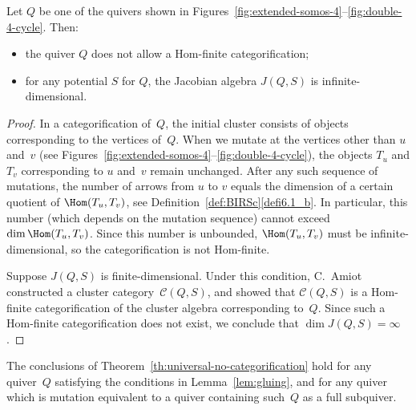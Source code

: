 

\begin{theorem}
\label{th:universal-no-categorification}
Let $Q$ be one of the quivers shown in Figures~\ref{fig:extended-somos-4}--\ref{fig:double-4-cycle}. 
Then:
\begin{itemize}%
\item
the quiver $Q$ does not allow a Hom-finite categorification; 
\item
for any potential $S$ for $Q$, the Jacobian algebra $J(Q,S)$ is infinite-dimensional.
\end{itemize}
\end{theorem}

\begin{proof}
In a categorification of~$Q$, the initial cluster consists of objects corresponding to the vertices of~$Q$. When we mutate at the vertices other than $u$ and~$v$ (see Figures~\ref{fig:extended-somos-4}--\ref{fig:double-4-cycle}), the objects $T_u$ and $T_v$ corresponding to $u$ and~$v$ remain unchanged. After any such sequence of mutations, the number of arrows from $u$ to $v$ equals the dimension of a certain quotient of $\Hom(T_u,T_v)$, see Definition~\ref{def:BIRSc}\ref{defi6.1_b}. 
In particular, this number (which depends on the mutation sequence) cannot exceed $\dim\Hom(T_u,T_v)$. 
Since this number is unbounded, $\Hom(T_u,T_v)$ must be infinite-dimensional, so the categorification is not Hom-finite. 

Suppose $J(Q,S)$ is finite-dimensional. Under this condition, 
C.~Amiot~\cite{amiot} constructed a cluster category~$\mathcal C(Q,S)$,
and showed that $\mathcal C(Q,S)$ is a Hom-finite categorification of the cluster algebra corresponding to~$Q$.
Since such a Hom-finite categorification does not exist, we conclude that $\dim J(Q,S)=\infty$. 
\end{proof}

The conclusions of Theorem~\ref{th:universal-no-categorification} hold for any quiver~$Q$ satisfying the conditions in Lemma~\ref{lem:gluing}, and for any quiver which is mutation equivalent to a quiver containing such~$Q$ as a full subquiver. 


